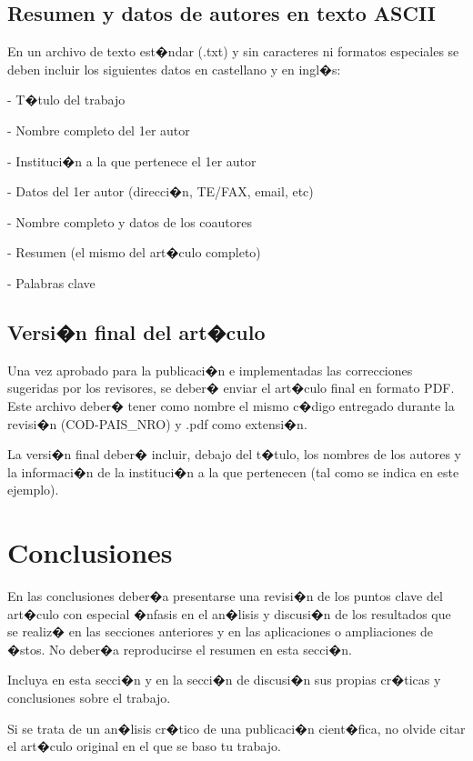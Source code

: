 \documentclass[conference,a4paper,10pt,oneside,final]{tfmpd}
\begin{document}
\subsection{Resumen y datos de autores en texto ASCII}

En un archivo de texto est�ndar (.txt) y sin caracteres ni formatos especiales se deben incluir los siguientes datos en castellano y en ingl�s:

- T�tulo del trabajo

- Nombre completo del 1er autor

- Instituci�n a la que pertenece el 1er autor

- Datos del 1er autor (direcci�n, TE/FAX, email, etc)

- Nombre completo y datos de los coautores

- Resumen (el mismo del art�culo completo)

- Palabras clave

\subsection{Versi�n final del art�culo}

Una vez aprobado para la publicaci�n e implementadas las correcciones sugeridas por los revisores, se deber� enviar el art�culo final en formato PDF. Este archivo deber� tener como nombre el mismo c�digo entregado durante la revisi�n (COD-PAIS\_NRO) y .pdf como extensi�n.

La versi�n final deber� incluir, debajo del t�tulo, los nombres de los autores y la informaci�n de la instituci�n a la que pertenecen (tal como se indica en este ejemplo).

\section{Conclusiones}

En las conclusiones deber�a presentarse una revisi�n de los puntos clave del art�culo con especial �nfasis en el an�lisis y discusi�n de los resultados que se realiz� en las secciones anteriores y en las aplicaciones o ampliaciones de �stos. No deber�a reproducirse el resumen en esta secci�n.

Incluya en esta secci�n y en la secci�n de discusi�n sus propias cr�ticas y conclusiones sobre el trabajo.

Si se trata de un an�lisis cr�tico de una publicaci�n cient�fica, no olvide citar el art�culo original en el que se baso tu trabajo.
\end{document}
